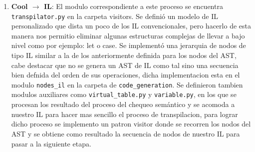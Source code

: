 \documentclass{article}
\begin{document}
\begin{enumerate}
	\item[] \textbf{Cool $\rightarrow$ IL}: El modulo correspondiente a este proceso se encuentra \verb|transpilator.py| en la carpeta visitors. Se defini\'o un modelo de IL personalizado que dista un poco de los IL convencionales, pero hacerlo de esta manera nos permitio eliminar algunas estructuras complejas de llevar a bajo nivel como por ejemplo: let o case. Se implement\'o una jerarquia de nodos de tipo IL similar a la de los anteriormente definida para los nodos del AST, cabe destacar que no se genera un AST de IL como tal sino una secuencia bien defnida del orden de sus operaciones, dicha implementacion esta en el modulo \verb|nodes_il| en la carpeta de \verb|code_generation|. Se definieron tambien modulos auxiliares como \verb|virtual_table.py| y \verb|variable.py|, en los que se procesan los resultado del proceso del chequeo sem\'antico y se acomoda a nuestro IL para hacer mas sencillo el proceso de transpilacion, para lograr dicho proceso se implemento un patron visitor donde se recorren los nodos del AST y se obtiene como resultado la secuencia de nodos de nuestro IL para pasar a la siguiente etapa.
	

\end{enumerate}
\end{document}
